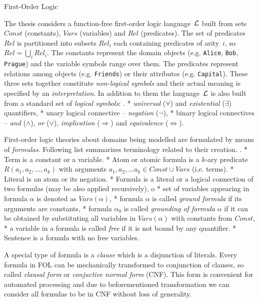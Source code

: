 \sec First-Order Logic
\par 
The thesis considers a function-free first-order logic language~$\cal{L}$ built from  sets $Const$ (constants), $Vars$ (variables) and $Rel$ (predicates). The set of  predicates $Rel$ is partitioned into subsets $Rel_i$ each containing predicates of arity~$i$, so $Rel = \bigcup_i Rel_i$. The constants represent the domain objects (e.g. {\tt Alice}, {\tt Bob}, {\tt Prague}) and the variable symbols range over them. The predicates represent relations among objects (e.g. {\tt Friends}) or their attributes (e.g. {\tt Capital}). 
These three sets together constitute {\em non-logical symbols} and their actual meaning is specified by an {\em interpretation}. In addition to them the language~$\cal{L}$ is also built from a standard set of {\em logical symbols}:
\begitems \style .
* {\em universal} ($\forall$) and {\em existential} ($\exists$) quantifiers,
* unary logical connective -- {\em negation} ($\neg$),
* binary logical connectives -- {\em and} ($\land$), {\em or} ($\lor$), {\em implication} ($\Rightarrow$) and {\em equivalence} ($\Leftrightarrow$).
\enditems
\par 
First-order logic theories about domains being modelled are formulated by means of {\em formulas}. Following list summarizes terminology related to their creation.
\begitems \style .
* {\sbf Term} is a constant or a variable.
* {\sbf Atom} or {\sbf atomic formula} is a $k$-ary predicate $R(a_1, a_2, ... , a_k)$ with arguments $a_1, a_2, ... a_k \in Const \cup Vars$ (i.e. terms).
* {\sbf Literal} is an atom or its negation.
* {\sbf Formula} is a literal or a logical connection of two formulas (may be also applied recursively),
\begitems \style o
* set of variables appearing in formula $\alpha$ is denoted as $Vars(\alpha)$,
* formula $\alpha$ is called {\em ground formula} if its arguments are constants,
* formula $\alpha_0$ is called {\em grounding of formula} $\alpha$ if it can be obtained by substituting all variables in $Vars(\alpha)$ with constants from $Const$,
* a variable in a formula is called {\em free} if it is not bound by any quantifier.
\enditems
* {\sbf Sentence} is a formula with no free variables.
\enditems
\par 
A special type of formula is a {\em clause} which is a disjunction of literals. Every formula in FOL can be mechanically transformed to conjunction of clauses, so called {\em clausal form} or {\em conjuctive normal form} (CNF). This form is convenient for automated processing and due to beforementioned transformation we can consider all formulas to be in CNF without loss of generality.
